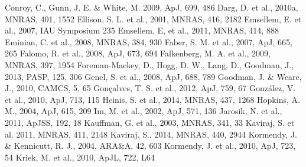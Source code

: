 \documentclass[useAMS,usenatbib]{mn2e}
\begin{document}
\begin{thebibliography}{}
 Conroy, C., Gunn, J. E. \& White, M. 2009, ApJ, 699, 486
 Darg, D. et al., 2010a, MNRAS, 401, 1552
 Ellison, S. L. et al., 2001, MNRAS, 416, 2182
 Emsellem, E. et al., 2007, IAU Symposium 235
 Emsellem, E, et al., 2011, MNRAS, 414, 888
 Eminian, C. et al., 2008, MNRAS, 384, 930
 Faber, S. M. et al., 2007, ApJ, 665, 265
 Falomo, R. et al., 2008, ApJ, 673, 694
 Falkenberg, M. A. et al., 2009, MNRAS, 397, 1954
 Foreman-Mackey, D., Hogg, D. W., Lang, D., Goodman, J., 2013, PASP, 125, 306
 Genel, S. et al., 2008, ApJ, 688, 789
 Goodman, J. \& Weare, J., 2010, CAMCS, 5, 65
 Gon\c calves, T. S. et al., 2012, ApJ, 759, 67
 Gonz\'alez, V. et al., 2010, ApJ, 713, 115
 Heinis, S. et al., 2014, MNRAS, 437, 1268
 Hopkins, A. M., 2004, ApJ, 615, 209
 Im, M. et al., 2002, ApJ, 571, 136
 Jarosik, N. et al., 2011, ApJSS, 192, 18
 Kauffman, G. et al., 2003, MNRAS, 341, 33
 Kaviraj, S. et al. 2011, MNRAS, 411, 2148
 Kaviraj, S., 2014, MNRAS, 440, 2944
 Kormendy, J. \& Kennicutt, R. J., 2004, ARA\&A, 42, 603
 Kormendy, J. et al., 2010, ApJ, 723, 54
 Kriek, M. et al., 2010, ApJL, 722, L64

\end{thebibliography}
\end{document}
